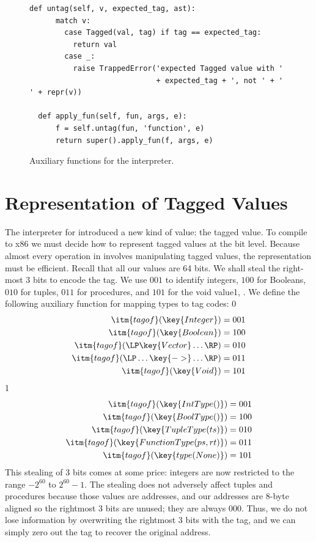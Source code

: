\documentclass[7x10]{TimesAPriori_MIT}%
\def\racketEd{0}
\def\pythonEd{1}
\def\edition{1}
\newcommand{\pythonColor}[0]{}
\newcommand{\python}[1]{{\if\edition\pythonEd\pythonColor #1\fi}}
\numberwithin{theorem}{chapter}
\numberwithin{definition}{chapter}
\numberwithin{equation}{chapter}
\begin{document}
\begin{figure}[tbp]
\begin{tcolorbox}[colback=white]
{\begin{lstlisting}[basicstyle=\ttfamily\footnotesize]
  def untag(self, v, expected_tag, ast):
      match v:
        case Tagged(val, tag) if tag == expected_tag:
          return val
        case _:
          raise TrappedError('expected Tagged value with '
                             + expected_tag + ', not ' + ' ' + repr(v))

  def apply_fun(self, fun, args, e):
      f = self.untag(fun, 'function', e)
      return super().apply_fun(f, args, e)
\end{lstlisting}
\fi}
  \end{tcolorbox}

  \caption{Auxiliary functions for the \LangDyn{} interpreter.}
\label{fig:interp-Ldyn-aux}
\end{figure}

\clearpage

\section{Representation of Tagged Values}

The interpreter for \LangDyn{} introduced a new kind of value: the
tagged value. To compile \LangDyn{} to x86 we must decide how to
represent tagged values at the bit level. Because almost every
operation in \LangDyn{} involves manipulating tagged values, the
representation must be efficient. Recall that all our values are 64
bits.  We shall steal the right-most $3$ bits to encode the tag.  We use
$001$ to identify integers, $100$ for Booleans, $010$ for tuples,
$011$ for procedures, and $101$ for the void value\python{,
  }. We define the following auxiliary function for mapping
types to tag codes:
%
{\if\edition\racketEd
\begin{align*}
\itm{tagof}(\key{Integer}) &= 001 \\
\itm{tagof}(\key{Boolean}) &= 100 \\
\itm{tagof}(\LP\key{Vector} \ldots\RP) &= 010 \\
\itm{tagof}(\LP\ldots \key{->} \ldots\RP) &= 011 \\
\itm{tagof}(\key{Void}) &= 101
\end{align*}
\fi}
{\if\edition\pythonEd\pythonColor
\begin{align*}
\itm{tagof}(\key{IntType()}) &= 001 \\
\itm{tagof}(\key{BoolType()}) &= 100 \\
\itm{tagof}(\key{TupleType(ts)}) &= 010 \\
\itm{tagof}(\key{FunctionType(ps, rt)}) &= 011 \\
\itm{tagof}(\key{type(None)}) &= 101
\end{align*}
\fi}
%
This stealing of 3 bits comes at some price: integers are now restricted
to the range $-2^{60}$ to $2^{60}-1$. The stealing does not adversely
affect tuples and procedures because those values are addresses, and
our addresses are 8-byte aligned so the rightmost 3 bits are unused;
they are always $000$. Thus, we do not lose information by overwriting
the rightmost 3 bits with the tag, and we can simply zero out the tag
to recover the original address.
\end{document}
